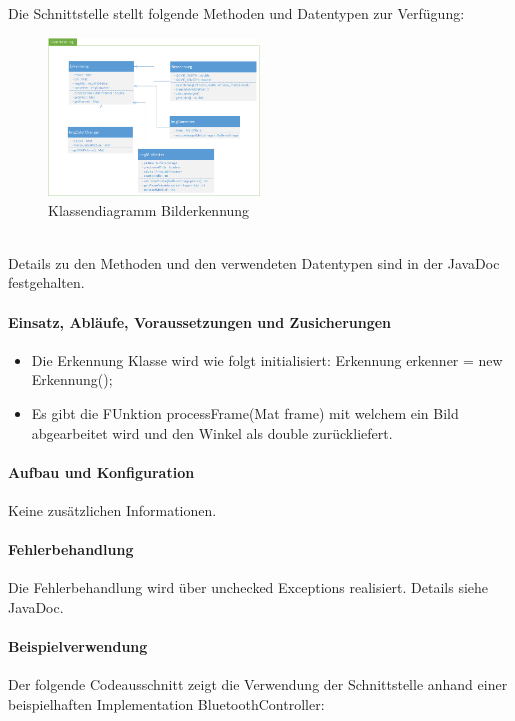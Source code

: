 Die Schnittstelle stellt folgende Methoden und Datentypen zur Verfügung:  \\
\begin{figure}[h!]          
	\centering             
	\includegraphics[width=0.5\textwidth]{fig/Klassendiagramm_Erkennung.png}
	\caption{Klassendiagramm Bilderkennung}
	\label{fig:Klassendiagramm Bilderkennung}        
\end{figure} \\
Details zu den Methoden und den verwendeten Datentypen sind in der JavaDoc festgehalten. \\

\paragraph{Einsatz, Abläufe, Voraussetzungen und Zusicherungen}
\begin{itemize}
	\item{Die Erkennung Klasse wird wie folgt initialisiert: Erkennung erkenner = new Erkennung(); }
	\item{Es gibt die FUnktion processFrame(Mat frame) mit welchem ein Bild abgearbeitet wird und den Winkel als double zurückliefert.}
\end{itemize}

\paragraph{Aufbau und Konfiguration} 
Keine zusätzlichen Informationen. \\

\paragraph{Fehlerbehandlung}
Die Fehlerbehandlung wird über unchecked Exceptions realisiert. Details siehe JavaDoc. \\

\paragraph{Beispielverwendung}
Der folgende Codeausschnitt zeigt die Verwendung der Schnittstelle anhand einer beispielhaften Implementation BluetoothController: \\

